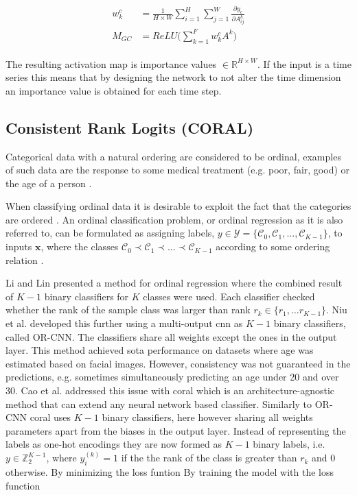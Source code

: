 \begin{align}
 \begin{split}
  w_k^c &= \frac{1}{H \times W} \sum_{i=1}^H \sum_{j=1}^W \frac{\partial y_c}{\partial A_{ij}^k} \\
  M_{GC} &= ReLU \big ( \sum_{k=1}^F w_k^c A^k \big)
  \label{eq:grad-cam}
 \end{split}
\end{align}

The resulting activation map is importance values $\in \mathbb{R}^{H \times W}$. If the input is a time series this means that by designing the network to not alter the time dimension an importance value is obtained for each time step.

\subsection{Consistent Rank Logits (CORAL)}
Categorical data with a natural ordering are considered to be ordinal, examples of such data are the response to some medical treatment (e.g. poor, fair, good) \cite{Agresti2007} or the age of a person \cite{Cao2019}.

When classifying ordinal data it is desirable to exploit the fact that the categories are ordered \cite{Agresti2007}. An ordinal classification problem, or ordinal regression as it is also referred to, can be formulated as assigning labels, $y \in \mathcal{Y} = \{\mathcal{C}_0, \mathcal{C}_1, \hdots, \mathcal{C}_{K-1} \}$, to inputs $\pmb{x}$, where the classes $\mathcal{C}_0 \prec \mathcal{C}_1 \prec \hdots \prec \mathcal{C}_{K-1}$ according to some ordering relation \cite{Cao2019}.

Li and Lin \cite{Li2007} presented a method for ordinal regression where the combined result of $K-1$ binary classifiers for $K$ classes were used. Each classifier checked whether the rank of the sample class was larger than rank $r_k \in \{r_1, \hdots r_{K-1}\}$. Niu et al. \cite{Niu2016} developed this further using a multi-output \gls{cnn} as $K-1$ binary classifiers, called OR-CNN. The classifiers share all weights except the ones in the output layer. This method achieved \gls{sota} performance on datasets where age was estimated based on facial images. However, consistency was not guaranteed in the predictions, e.g. sometimes simultaneously predicting an age under 20 and over 30. Cao et al. \cite{Cao2019} addressed this issue with \gls{coral} which is an architecture-agnostic method that can extend any neural network based classifier. Similarly to OR-CNN \gls{coral} uses $K-1$ binary classifiers, here however sharing all weights parameters apart from the biases in the output layer. Instead of representing the labels as one-hot encodings they are now formed as $K-1$ binary labels, i.e. $y \in \mathbb{Z}_2^{K-1}$, where $y_i^{(k)} = 1$ if the the rank of the class is greater than $r_k$ and 0 otherwise. By minimizing the loss funtion By training the model with the loss function %

